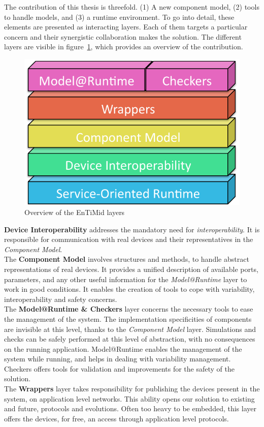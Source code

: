 The contribution of this thesis is threefold. (1) A new component model, (2) tools to handle models, and (3) a runtime environment. To go into detail, these elements are presented as interacting layers. Each of them targets a particular concern and their synergistic collaboration makes the solution.
The different layers are visible in figure~\ref{fig:allLayersBig}, which provides an overview of the contribution.\\

\begin{figure}[h!]
  \centering
  \includegraphics[width=.3\textwidth]{part2/pics/layers/AllBig.pdf}
  \caption{Overview of the EnTiMid layers}
  \label{fig:allLayersBig}
\end{figure}


{\bf Device Interoperability} addresses the mandatory need for {\it interoperability}. It is responsible for communication with real devices and their representatives in the {\it Component Model}.\\

The {\bf Component Model} involves structures and methods, to handle abstract representations of real devices. It provides a unified description of available ports, parameters, and any other useful information for the {\it Model@Runtime} layer to work in good conditions. It enables the creation of tools to cope with variability, interoperability and safety concerns.\\

The {\bf Model@Runtime \& Checkers} layer concerns the necessary tools to ease the management of the system. The implementation specificities of components are invisible at this level, thanks to the {\it Component Model} layer. Simulations and checks can be safely performed at this level of abstraction, with no consequences on the running application. Model@Runtime enables the management of the system while running, and helps in dealing with variability management. Checkers offers tools for validation and improvements for the safety of the solution.\\

The {\bf Wrappers} layer takes responsibility for publishing the devices present in the system, on application level networks. This ability opens our solution to existing and future, protocols and evolutions. Often too heavy to be embedded, this layer offers the devices, for free, an access through application level protocols.\\

